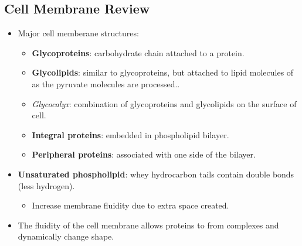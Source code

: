 \documentclass[12pt,a4paper]{article}
\begin{document}
\subsection{Cell Membrane Review}
\begin{itemize}
    \item Major cell memberane structures:
        \begin{itemize}
            \item \textbf{Glycoproteins}: carbohydrate chain attached to a protein.
            \item \textbf{Glycolipids}: similar to glycoproteins, but attached to lipid molecules of  as the pyruvate molecules are processed..
            \item \textit{Glycocalyx}: combination of glycoproteins and glycolipids on the surface of cell.
            \item \textbf{Integral proteins}: embedded in phospholipid bilayer.
            \item \textbf{Peripheral proteins}: associated with one side of the bilayer.
        \end{itemize}
    \item \textbf{Unsaturated phospholipid}: whey hydrocarbon tails contain double bonds (less hydrogen).
        \begin{itemize}
            \item Increase membrane fluidity due to extra space created.
        \end{itemize}
    \item The fluidity of the cell membrane allows proteins to from complexes and dynamically change shape.
\end{itemize}
\end{document}
